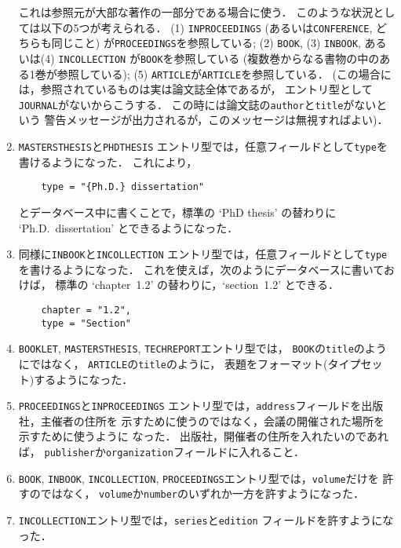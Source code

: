 \begin{enumerate}
これは参照元が大部な著作の一部分である場合に使う．
このような状況としては以下の5つが考えられる．
(1) {\tt INPROCEEDINGS}
(あるいは{\tt CONFERENCE}, どちらも同じこと)
が{\tt PROCEEDINGS}を参照している;
(2) {\tt BOOK}, (3) {\tt INBOOK},
あるいは(4) {\tt INCOLLECTION}
が{\tt BOOK}を参照している
(複数巻からなる書物の中のある1巻が参照している);
(5) {\tt ARTICLE}が{\tt ARTICLE}を参照している．
(この場合には，参照されているものは実は論文誌全体であるが，
エントリ型として{\tt JOURNAL}がないからこうする．
この時には論文誌の{\tt author}と{\tt title}がないという
警告メッセージが出力されるが，このメッセージは無視すればよい)．

\item
{\tt MASTERSTHESIS}と{\tt PHDTHESIS}
エントリ型では，任意フィールドとして{\tt type}を書けるようになった．
これにより，
\begin{verbatim}
    type = "{Ph.D.} dissertation"
\end{verbatim}
とデータベース中に書くことで，標準の `PhD thesis' の替わりに
`Ph.D.\ dissertation' とできるようになった．

\item
同様に{\tt INBOOK}と{\tt INCOLLECTION}
エントリ型では，任意フィールドとして{\tt type}を書けるようになった．
これを使えば，次のようにデータベースに書いておけば，
標準の `chapter~1.2' の替わりに，`section~1.2' とできる．
\begin{verbatim}
    chapter = "1.2",
    type = "Section"
\end{verbatim}

\item
{\tt BOOKLET}, {\tt MASTERSTHESIS},
{\tt TECHREPORT}エントリ型では，
{\tt BOOK}の{\tt title}のようにではなく，
{\tt ARTICLE}の{\tt title}のように，
表題をフォーマット(タイプセット)するようになった．

\item
{\tt PROCEEDINGS}と{\tt INPROCEEDINGS}
エントリ型では，{\tt address}フィールドを出版社，主催者の住所を
示すために使うのではなく，会議の開催された場所を示すために使うように
なった．
出版社，開催者の住所を入れたいのであれば，
{\tt publisher}か{\tt organization}フィールドに入れること．

\item
{\tt BOOK}, {\tt INBOOK}, {\tt INCOLLECTION},
{\tt PROCEEDINGS}エントリ型では，{\tt volume}だけを
許すのではなく，
{\tt volume}か{\tt number}のいずれか一方を許すようになった．

\item
{\tt INCOLLECTION}エントリ型では，{\tt series}と{\tt edition}
フィールドを許すようになった．


\end{enumerate}
